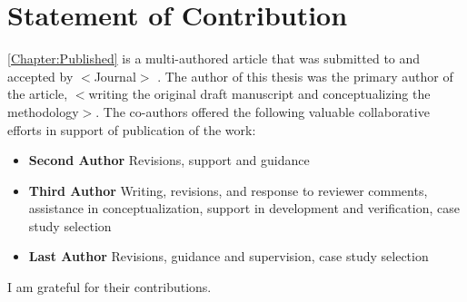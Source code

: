 \chapter{Statement of Contribution}
 \cref{Chapter:Published} is a multi-authored article that was submitted to and accepted by $<$Journal$>$ \cite{MyOwnPaper}. The author of this thesis was the primary author of the article, $<$writing the original draft manuscript and conceptualizing the methodology$>$. The co-authors offered the following valuable collaborative efforts in support of publication of the work: 
\begin{itemize}
	\item \textbf{Second Author} Revisions, support and guidance
	\item \textbf{Third Author} Writing, revisions, and response to reviewer comments, assistance in conceptualization, support in development and verification, case study selection 
	\item \textbf{Last Author} Revisions, guidance and supervision, case study selection
\end{itemize}

I am grateful for their contributions.